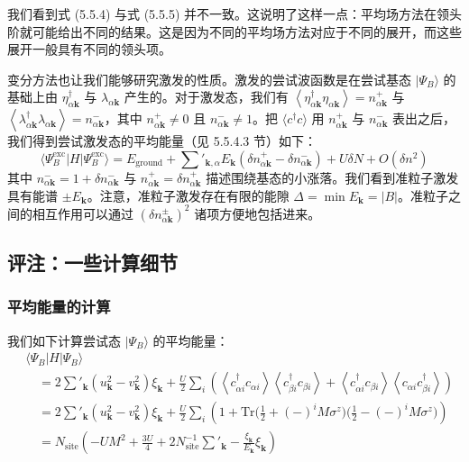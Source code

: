 我们看到式 (5.5.4) 与式 (5.5.5) 并不一致。这说明了这样一点：平均场方法在领头阶就可能给出不同的结果。这是因为不同的平均场方法对应于不同的展开，而这些展开一般具有不同的领头项。

变分方法也让我们能够研究激发的性质。激发的尝试波函数是在尝试基态 $|\Psi_{B}\rangle$ 的基础上由 $\eta^{\dagger}_{\alpha\pmb{k}}$ 与 $\lambda_{\alpha\pmb{k}}$ 产生的。对于激发态，我们有 $\left\langle\eta^{\dagger}_{\alpha\pmb{k}}\eta_{\alpha\pmb{k}}\right\rangle=n^{+}_{\alpha\pmb{k}}$ 与 $\left\langle\lambda^{\dagger}_{\alpha\pmb{k}}\lambda_{\alpha\pmb{k}}\right\rangle=n^{-}_{\alpha\pmb{k}}$，其中 $n^{+}_{\alpha\pmb{k}}\neq 0$ 且 $n^{-}_{\alpha\pmb{k}}\neq 1$。把 $\langle c^{\dagger}c\rangle$ 用 $n^{+}_{\alpha\pmb{k}}$ 与 $n^{-}_{\alpha\pmb{k}}$ 表出之后，我们得到尝试激发态的平均能量（见 5.5.4.3 节）如下：
\begin{equation*}
\langle\Psi^{\mathrm{exc}}_{B}|H|\Psi^{\mathrm{exc}}_{B}\rangle=E_{\mathrm{ground}}+\sum'_{\pmb{k},\alpha}E_{\pmb{k}}(\delta n^{+}_{\alpha\pmb{k}}-\delta n^{-}_{\alpha\pmb{k}})+U\delta N+O(\delta n^{2})
\end{equation*}
其中 $n^{-}_{\alpha\pmb{k}}=1+\delta n^{-}_{\alpha\pmb{k}}$ 与 $n^{+}_{\alpha\pmb{k}}=\delta n^{+}_{\alpha\pmb{k}}$ 描述围绕基态的小涨落。我们看到准粒子激发具有能谱 $\pm E_{\pmb{k}}$。注意，准粒子激发存在有限的能隙 $\Delta=\min E_{\pmb{k}}=|B|$。准粒子之间的相互作用可以通过 $(\delta n^{\pm}_{\alpha\pmb{k}})^{2}$ 诸项方便地包括进来。

\subsection{评注：一些计算细节}

\subsubsection{平均能量的计算}

我们如下计算尝试态 $|\Psi_{B}\rangle$ 的平均能量：
\begin{align*}
&\langle\Psi_{B}|H|\Psi_{B}\rangle\\
&\quad=2\sum'_{\pmb{k}}(u^{2}_{\pmb{k}}-v^{2}_{\pmb{k}})\xi_{\pmb{k}}+\frac{U}{2}\sum_{i}\left(\left\langle c^{\dagger}_{\alpha i}c_{\alpha i}\right\rangle\left\langle c^{\dagger}_{\beta i}c_{\beta i}\right\rangle+\left\langle c^{\dagger}_{\alpha i}c_{\beta i}\right\rangle\left\langle c_{\alpha i}c^{\dagger}_{\beta i}\right\rangle\right)\\
&\quad=2\sum'_{\pmb{k}}(u^{2}_{\pmb{k}}-v^{2}_{\pmb{k}})\xi_{\pmb{k}}+\frac{U}{2}\sum_{i}\left(1+\mathrm{Tr}\big(\frac{1}{2}+(-)^{i}M\sigma^{z}\big)\big(\frac{1}{2}-(-)^{i}M\sigma^{z}\big)\right)\\
&\quad=N_{\mathrm{site}}\left(-UM^{2}+\frac{3U}{4}+2N^{-1}_{\mathrm{site}}\sum'_{\pmb{k}}-\frac{\xi_{\pmb{k}}}{E_{\pmb{k}}}\xi_{\pmb{k}}\right)
\end{align*}

